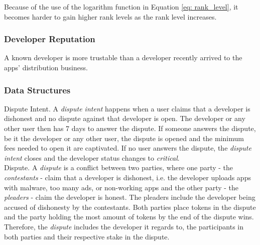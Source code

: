 Because of the use of the logarithm function in Equation \ref{eq: rank_level}, it becomes harder to gain higher rank levels as the rank level increases.




\subsubsection{Developer Reputation}

A known developer is more trustable than a developer recently arrived to the apps' distribution business.

%


\subsubsection{Data Structures}

\noindent \textsf{Dispute Intent}. A \textit{dispute intent} happens when a user claims that a developer is dishonest and no dispute against that developer is open. The developer or any other user then has 7 days to answer the dispute. If someone answers the dispute, be it the developer or any other user, the dispute is opened and the minimum fees needed to open it are captivated. If no user answers the dispute, the \textit{dispute intent} closes and the developer status changes to \textit{critical}. \\

\noindent \textsf{Dispute}. A \textit{dispute} is a conflict between two parties, where one party - the \textit{contestants} - claim that a developer is dishonest, i.e. the developer uploads apps with malware, too many ads, or non-working apps and the other party - the \textit{pleaders} - claim the developer is honest. The pleaders include the developer being accused of dishonesty by the contestants. Both parties place tokens in the dispute and the party holding the most amount of tokens by the end of the dispute wins. Therefore, the \textit{dispute} includes the developer it regards to, the participants in both parties and their respective stake in the dispute. \\

